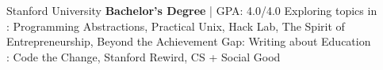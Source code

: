 	{%
		Stanford University}
	{%
		\textbf{Bachelor's Degree} | GPA: 4.0/4.0}
	{%
	Exploring topics in \\
	: Programming Abstractions, Practical Unix, Hack Lab, The Spirit of Entrepreneurship, Beyond the Achievement Gap: Writing about Education \\
	: Code the Change, Stanford Rewird, CS + Social Good \\}